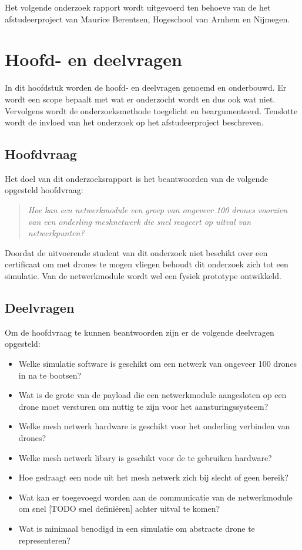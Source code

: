 \documentclass[a4paper, 11pt, oneside]{report}
\begin{document}
Het volgende onderzoek rapport wordt uitgevoerd ten behoeve van de het afstudeerproject van Maurice Berentsen, Hogeschool van Arnhem en Nijmegen.


\chapter{Hoofd- en deelvragen}
In dit hoofdstuk worden de hoofd- en deelvragen genoemd en onderbouwd.
Er wordt een scope bepaalt met wat er onderzocht wordt en dus ook wat niet.
Vervolgens wordt de onderzoeksmethode toegelicht en beargumenteerd.
Tenslotte wordt de invloed van het onderzoek op het afstudeerproject beschreven.

\section{Hoofdvraag}
Het doel van dit onderzoeksrapport is het beantwoorden van de volgende opgesteld hoofdvraag:
\begin{quotation}
\textit{Hoe kan een netwerkmodule een groep van ongeveer 100 drones voorzien van een onderling meshnetwerk die snel reageert op uitval van netwerkpunten?}	
\end{quotation}
Doordat de uitvoerende student van dit onderzoek niet beschikt over een certificaat om met drones te mogen vliegen behoudt dit onderzoek zich tot een simulatie.
Van de netwerkmodule wordt wel een fysiek prototype ontwikkeld.

\section{Deelvragen}

Om de hoofdvraag te kunnen beantwoorden zijn er de volgende deelvragen opgesteld:

\begin{itemize}
	\item Welke simulatie software is geschikt om een netwerk van ongeveer 100 drones in na te bootsen?
	\item Wat is de grote van de payload die een netwerkmodule aangesloten op een drone moet versturen om nuttig te zijn voor het aansturingssysteem?
	\item Welke mesh netwerk hardware is geschikt voor het onderling verbinden van drones?
	\item Welke mesh netwerk libary is geschikt voor de te gebruiken hardware?
	\item Hoe gedraagt een node uit het mesh netwerk zich bij slecht of geen bereik?
	\item Wat kan er toegevoegd worden aan de communicatie van de netwerkmodule om snel [TODO snel definiëren] achter uitval te komen?
	\item Wat is minimaal benodigd in een simulatie om abstracte drone te representeren?
\end{itemize}
\end{document}
